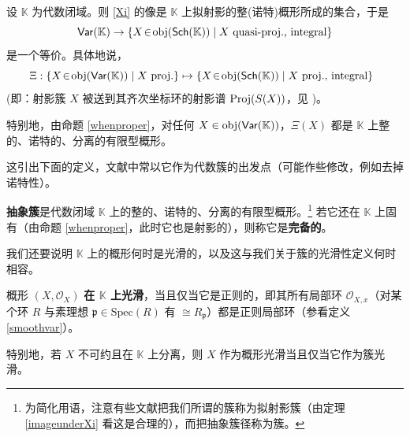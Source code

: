 \begin{Thm}\label{imageunderXi}
设 $\mathbb{K}$ 为代数闭域。则 \eqref{Xi} 的像是 $\mathbb{K}$ 上拟射影的整\textup(诺特\textup)概形所成的集合，于是
\begin{equation}
	\mathsf{Var}(\mathbb{K})\rightarrow\{X\!\in\!\textup{obj}(\mathsf{Sch}(\mathbb{K}))\mid X \text{ quasi-proj., integral}\}
\end{equation}
是一个等价。具体地说，
\begin{equation}
	\mkern-12mu\Xi:\{X\!\in\!\textup{obj}(\mathsf{Var}(\mathbb{K})) \mid X\text{ proj.}\}\mapsto\{X\!\in\!\textup{obj}(\mathsf{Sch}(\mathbb{K})) \mid X\text{ proj., integral}\}
\end{equation}
\textup(即：射影簇 $X$ 被送到其齐次坐标环的射影谱 $\textup{Proj}(S(X))$，见 \textup{\cite[习题 II.2.14]{[Har77]}}\textup)。 

特别地，由命题 \ref{whenproper}，对任何 $X\in\textup{obj}(\mathsf{Var}(\mathbb{K}))$，$\Xi(X)$ 都是 $\mathbb{K}$ 上整的、诺特的、分离的有限型概形。
\end{Thm}

这引出下面的定义，文献中常以它作为代数簇的出发点（可能作些修改，例如去掉诺特性）。

\begin{Def}\label{abstractvar}
\textbf{抽象簇}是代数闭域 $\mathbb{K}$ 上的整的、诺特的、分离的有限型概形。\footnote{为简化用语，注意有些文献把我们所谓的簇称为拟射影簇（由定理 \ref{imageunderXi} 看这是合理的），而把抽象簇径称为簇。} 若它还在 $\mathbb{K}$ 上固有（由命题 \ref{whenproper}，此时它也是射影的），则称它是\textbf{完备的}。
\end{Def}

我们还要说明 $\mathbb{K}$ 上的概形何时是光滑的，以及这与我们关于簇的光滑性定义何时相容。

\begin{Def}\label{smoothsch}
概形 $(X,\mathcal{O}_X)$ \textbf{在 $\mathbb{K}$ 上光滑}，当且仅当它是正则的，即其所有局部环 $\mathcal{O}_{X,x}$（对某个环 $R$ 与素理想 $\mathfrak{p}\in\text{Spec}(R)$ 有 $\cong R_\mathfrak{p}$）都是正则局部环（参看定义 \ref{smoothvar}）。

特别地，若 $X$ 不可约且在 $\mathbb{K}$ 上分离，则 $X$ 作为概形光滑当且仅当它作为簇光滑。
\end{Def}

